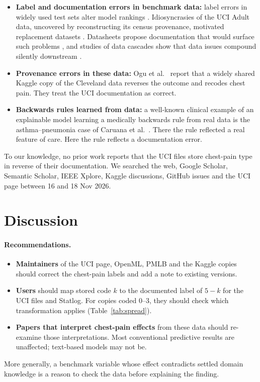 \documentclass[11pt]{article}
\begin{document}
\begin{itemize}
\item \textbf{Label and documentation errors in benchmark data:} label errors in widely used test sets alter model rankings \cite{northcutt2021}. Idiosyncrasies of the UCI Adult data, uncovered by reconstructing its census provenance, motivated replacement datasets \cite{ding2021}. Datasheets propose documentation that would surface such problems \cite{gebru2021}, and studies of data cascades show that data issues compound silently downstream \cite{sambasivan2021}.
\item \textbf{Provenance errors in these data:} Ogu et al.~\cite{ogu2026} report that a widely shared Kaggle copy of the Cleveland data reverses the outcome and recodes chest pain. They treat the UCI documentation as correct.
\item \textbf{Backwards rules learned from data:} a well-known clinical example of an explainable model learning a medically backwards rule from real data is the asthma--pneumonia case of Caruana et al.~\cite{caruana2015}. There the rule reflected a real feature of care. Here the rule reflects a documentation error.
\end{itemize}
To our knowledge, no prior work reports that the UCI files store chest-pain type in reverse of their documentation. We searched the web, Google Scholar, Semantic Scholar, IEEE Xplore, Kaggle discussions, GitHub issues and the UCI page between 16 and 18 Nov 2026.

\section{Discussion}

\paragraph{Recommendations.}
\begin{itemize}
\item \textbf{Maintainers} of the UCI page, OpenML, PMLB and the Kaggle copies should correct the chest-pain labels and add a note to existing versions.
\item \textbf{Users} should map stored code $k$ to the documented label of $5-k$ for the UCI files and Statlog. For copies coded 0--3, they should check which transformation applies (Table~\ref{tab:spread}).
\item \textbf{Papers that interpret chest-pain effects} from these data should re-examine those interpretations. Most conventional predictive results are unaffected; text-based models may not be.
\end{itemize}
More generally, a benchmark variable whose effect contradicts settled domain knowledge is a reason to check the data before explaining the finding.
\end{document}
